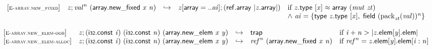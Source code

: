 $$
\begin{array}{@{}l@{}lcl@{}l@{}}
{[\textsc{\scriptsize E{-}array.new\_fixed}]} \quad & {\mathit{z}} ; {{\mathit{val}}^{{\mathit{n}}}}~(\mathsf{array.new\_fixed}~{\mathit{x}}~{\mathit{n}}) &\hookrightarrow& {\mathit{z}}{}[\mathsf{array} = ..{\mathit{ai}}] ; (\mathsf{ref.array}~{|{\mathit{z}}.\mathsf{array}|}) &\quad
  \mbox{if}~{\mathit{z}}.\mathsf{type}~{}[{\mathit{x}}] \approx \mathsf{array}~({\mathit{mut}}~{\mathit{zt}}) \\
 &&&&\quad {\land}~{\mathit{ai}} = \{ \begin{array}[t]{@{}l@{}}
\mathsf{type}~{\mathit{z}}.\mathsf{type}~{}[{\mathit{x}}],\; \mathsf{field}~{({{\mathrm{pack}}}_{{\mathit{zt}}}({\mathit{val}}))^{{\mathit{n}}}} \}\end{array} \\
\end{array}
$$

\vspace{1ex}

$$
\begin{array}{@{}l@{}lcl@{}l@{}}
{[\textsc{\scriptsize E{-}array.new\_elem{-}oob}]} \quad & {\mathit{z}} ; (\mathsf{i{\scriptstyle32}}.\mathsf{const}~{\mathit{i}})~(\mathsf{i{\scriptstyle32}}.\mathsf{const}~{\mathit{n}})~(\mathsf{array.new\_elem}~{\mathit{x}}~{\mathit{y}}) &\hookrightarrow& \mathsf{trap} &\quad
  \mbox{if}~{\mathit{i}} + {\mathit{n}} > {|{{\mathit{z}}.\mathsf{elem}}{{}[{\mathit{y}}]}.\mathsf{elem}|} \\
{[\textsc{\scriptsize E{-}array.new\_elem{-}alloc}]} \quad & {\mathit{z}} ; (\mathsf{i{\scriptstyle32}}.\mathsf{const}~{\mathit{i}})~(\mathsf{i{\scriptstyle32}}.\mathsf{const}~{\mathit{n}})~(\mathsf{array.new\_elem}~{\mathit{x}}~{\mathit{y}}) &\hookrightarrow& {{\mathit{ref}}^{{\mathit{n}}}}~(\mathsf{array.new\_fixed}~{\mathit{x}}~{\mathit{n}}) &\quad
  \mbox{if}~{{\mathit{ref}}^{{\mathit{n}}}} = {{\mathit{z}}.\mathsf{elem}}{{}[{\mathit{y}}]}.\mathsf{elem}{}[{\mathit{i}} : {\mathit{n}}] \\
\end{array}
$$

\vspace{1ex}

